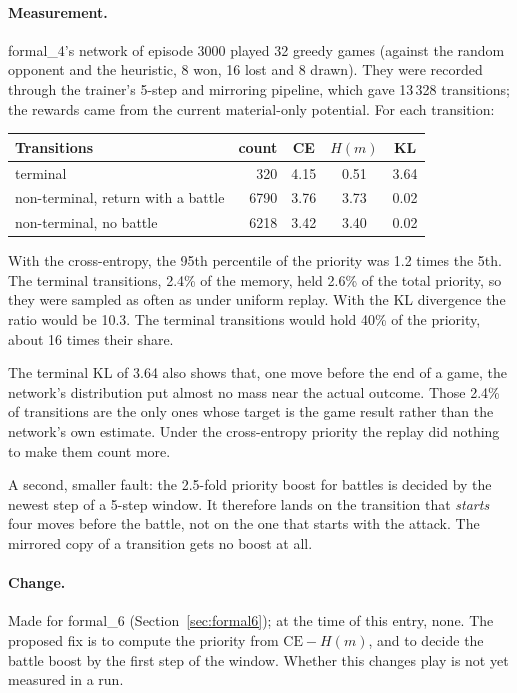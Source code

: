 \paragraph{Measurement.} formal\_4's network of episode 3000 played 32 greedy games (against the
random opponent and the heuristic, 8 won, 16 lost and 8 drawn). They were recorded through the
trainer's 5-step and mirroring pipeline, which gave 13\,328 transitions; the rewards came from the
current material-only potential. For each transition:
\begin{center}
\begin{tabular}{lrccc}
\toprule
Transitions & count & CE & $H(m)$ & KL \\
\midrule
terminal                              & 320   & 4.15 & 0.51 & 3.64 \\
non-terminal, return with a battle    & 6790  & 3.76 & 3.73 & 0.02 \\
non-terminal, no battle               & 6218  & 3.42 & 3.40 & 0.02 \\
\bottomrule
\end{tabular}
\end{center}
With the cross-entropy, the 95th percentile of the priority was 1.2 times the 5th. The terminal
transitions, 2.4\% of the memory, held 2.6\% of the total priority, so they were sampled as
often as under uniform replay. With the KL divergence the ratio would be 10.3. The terminal
transitions would hold 40\% of the priority, about 16 times their share.

The terminal KL of 3.64 also shows that, one move before the end of a game, the network's
distribution put almost no mass near the actual outcome. Those 2.4\% of transitions are the only
ones whose target is the game result rather than the network's own estimate. Under the
cross-entropy priority the replay did nothing to make them count more.

A second, smaller fault: the 2.5-fold priority boost for battles is decided by the newest step of
a 5-step window. It therefore lands on the transition that \emph{starts} four moves before the
battle, not on the one that starts with the attack. The mirrored copy of a transition gets no
boost at all.

\paragraph{Change.} Made for formal\_6 (Section~\ref{sec:formal6}); at the time of this entry, none. The proposed fix is to compute the priority from
$\mathrm{CE} - H(m)$, and to decide the battle boost by the first step of the window. Whether this
changes play is not yet measured in a run.

